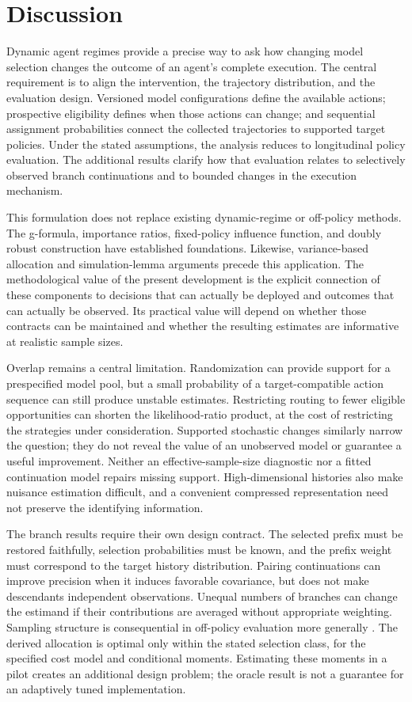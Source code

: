 \section{Discussion}
\label{sec:discussion}

Dynamic agent regimes provide a precise way to ask how changing model selection changes the outcome of an agent's complete execution. The central requirement is to align the intervention, the trajectory distribution, and the evaluation design. Versioned model configurations define the available actions; prospective eligibility defines when those actions can change; and sequential assignment probabilities connect the collected trajectories to supported target policies. Under the stated assumptions, the analysis reduces to longitudinal policy evaluation. The additional results clarify how that evaluation relates to selectively observed branch continuations and to bounded changes in the execution mechanism.

This formulation does not replace existing dynamic-regime or off-policy methods. The g-formula, importance ratios, fixed-policy influence function, and doubly robust construction have established foundations. Likewise, variance-based allocation and simulation-lemma arguments precede this application. The methodological value of the present development is the explicit connection of these components to decisions that can actually be deployed and outcomes that can actually be observed. Its practical value will depend on whether those contracts can be maintained and whether the resulting estimates are informative at realistic sample sizes.

Overlap remains a central limitation. Randomization can provide support for a prespecified model pool, but a small probability of a target-compatible action sequence can still produce unstable estimates. Restricting routing to fewer eligible opportunities can shorten the likelihood-ratio product, at the cost of restricting the strategies under consideration. Supported stochastic changes similarly narrow the question; they do not reveal the value of an unobserved model or guarantee a useful improvement. Neither an effective-sample-size diagnostic nor a fitted continuation model repairs missing support. High-dimensional histories also make nuisance estimation difficult, and a convenient compressed representation need not preserve the identifying information.

The branch results require their own design contract. The selected prefix must be restored faithfully, selection probabilities must be known, and the prefix weight must correspond to the target history distribution. Pairing continuations can improve precision when it induces favorable covariance, but does not make descendants independent observations. Unequal numbers of branches can change the estimand if their contributions are averaged without appropriate weighting. Sampling structure is consequential in off-policy evaluation more generally \citep{kallus2021multiple}. The derived allocation is optimal only within the stated selection class, for the specified cost model and conditional moments. Estimating these moments in a pilot creates an additional design problem; the oracle result is not a guarantee for an adaptively tuned implementation.

